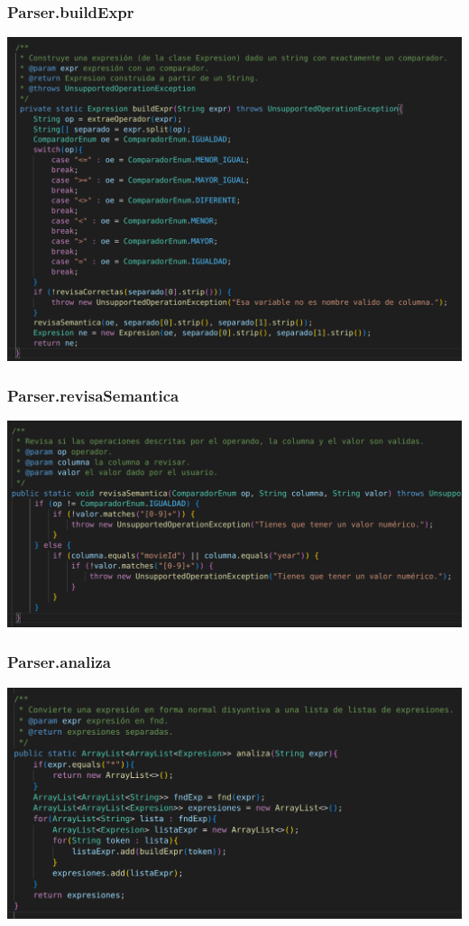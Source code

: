 \documentclass{beamer}
\begin{document}
\begin{frame}
\frametitle{Parser.buildExpr}
\includegraphics[width=\linewidth]{parser_buildexpr}
\end{frame}

\begin{frame}
\frametitle{Parser.revisaSemantica}
\includegraphics[width=\linewidth]{parser_revisasemantica}
\end{frame}

\begin{frame}
\frametitle{Parser.analiza}
\includegraphics[width=\linewidth]{parser_analiza}
\end{frame}
\end{document}
